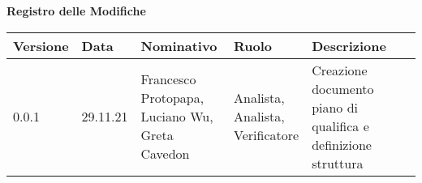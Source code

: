 {\LARGE{\textbf{Registro delle Modifiche}}} \\


\begin{tabular}{|m{}<{\centering}|m{}<{\centering}|m{}<{\centering}|m{}<{\centering}|m{}<{\centering}|}
	\hline \rowcolor{azzurro_scuro!70}
	\textbf{Versione}&\textbf{Data}&\textbf{Nominativo}&\textbf{Ruolo}&\textbf{Descrizione}\\
	\hline \rowcolor{azzurro_chiaro!30}
	 0.0.1&29.11.21&\shortstack{Francesco Protopapa,\\Luciano Wu,\\Greta Cavedon}&\shortstack{Analista,\\Analista,\\Verificatore}&Creazione documento piano di qualifica e definizione struttura
	 \\
	 \hline
\end{tabular}